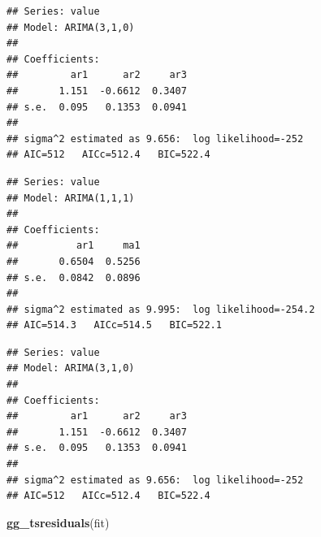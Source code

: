 \documentclass[]{book}
\newenvironment{Shaded}{\begin{snugshade}}{\end{snugshade}}
\newcommand{\DataTypeTok}[1]{\textcolor[rgb]{0.13,0.29,0.53}{#1}}
\newcommand{\DecValTok}[1]{\textcolor[rgb]{0.00,0.00,0.81}{#1}}
\newcommand{\KeywordTok}[1]{\textcolor[rgb]{0.13,0.29,0.53}{\textbf{#1}}}
\newcommand{\NormalTok}[1]{#1}
\newcommand{\OperatorTok}[1]{\textcolor[rgb]{0.81,0.36,0.00}{\textbf{#1}}}
\newcommand{\OtherTok}[1]{\textcolor[rgb]{0.56,0.35,0.01}{#1}}
\newcommand{\StringTok}[1]{\textcolor[rgb]{0.31,0.60,0.02}{#1}}
\begin{document}
\begin{verbatim}
## Series: value 
## Model: ARIMA(3,1,0) 
## 
## Coefficients:
##         ar1      ar2     ar3
##       1.151  -0.6612  0.3407
## s.e.  0.095   0.1353  0.0941
## 
## sigma^2 estimated as 9.656:  log likelihood=-252
## AIC=512   AICc=512.4   BIC=522.4
\end{verbatim}

\begin{Shaded}
\end{Shaded}

\begin{verbatim}
## Series: value 
## Model: ARIMA(1,1,1) 
## 
## Coefficients:
##          ar1     ma1
##       0.6504  0.5256
## s.e.  0.0842  0.0896
## 
## sigma^2 estimated as 9.995:  log likelihood=-254.2
## AIC=514.3   AICc=514.5   BIC=522.1
\end{verbatim}

\begin{Shaded}
\end{Shaded}

\begin{verbatim}
## Series: value 
## Model: ARIMA(3,1,0) 
## 
## Coefficients:
##         ar1      ar2     ar3
##       1.151  -0.6612  0.3407
## s.e.  0.095   0.1353  0.0941
## 
## sigma^2 estimated as 9.656:  log likelihood=-252
## AIC=512   AICc=512.4   BIC=522.4
\end{verbatim}

\begin{Shaded}
\begin{Highlighting}[]
\KeywordTok{gg_tsresiduals}\NormalTok{(fit)}
\end{Highlighting}
\end{Shaded}
\end{document}

